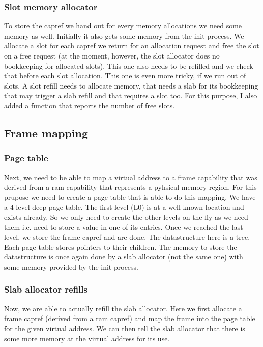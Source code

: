 \subsubsection{Slot memory allocator}

To store the capref we hand out for every memory allocations we need some memory as well. Initially it also gets some memory from the init process.
We allocate a slot for each capref we return for an allocation request and free the slot on a free request (at the moment, however, the slot allocator does no bookkeeping for allocated slots).
This one also needs to be refilled and we check that before each slot allocation. This one is even more tricky, if we run out of slots. A slot refill needs to allocate memory, that needs a slab for its bookkeeping that may trigger a slab refill and that requires a slot too.
For this purpose, I also added a function that reports the number of free slots.

\subsection{Frame mapping}

\subsubsection{Page table}

Next, we need to be able to map a virtual address to a frame capability that was derived from a ram capability that represents a pyhsical memory region.
For this prupose we need to create a page table that is able to do this mapping.
We have a 4 level deep page table. The first level (L0) is at a well known location and exists already. So we only need to create the other levels on the fly as we need them i.e. need to store a value in one of its entries.
Once we reached the last level, we store the frame capref and are done.
The datastructure here is a tree. Each page table stores pointers to their children.
The memory to store the datastructure is once again done by a slab allocator (not the same one) with some memory provided by the init process.

\subsubsection{Slab allocator refills}

Now, we are able to actually refill the slab allocator.
Here we first allocate a frame capref (derived from a ram capref) and map the frame into the page table for the given virtual address. We can then tell the slab allocator that there is some more memory at the virtual address for its use.

